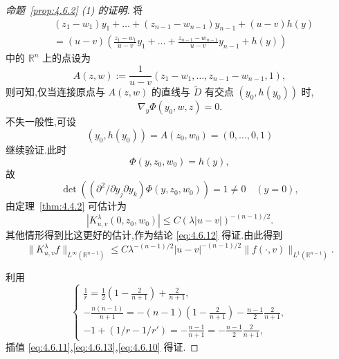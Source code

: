 \begin{proof}[命题~\ref{prop:4.6.2} (1) 的证明]
将
\begin{equation}
\begin{aligned}
& (z_{1} - w_{1})y_{1} + \ldots + (z_{n-1} - w_{n-1})y_{n-1} + (u - v)h(y) \\
& = (u - v)\left(\frac{z_{1} - w_{1}}{u - v}y_{1} + \ldots + \frac{z_{n-1} - w_{n-1}}{u - v}y_{n-1} + h(y)\right)
\end{aligned}
\end{equation}
中的 $\mathbb{R}^{n}$ 上的点设为
\begin{equation*}
A(z, w) := \frac{1}{u - v}(z_{1} - w_{1}, \ldots, z_{n-1} - w_{n-1}, 1),
\end{equation*}
则可知,仅当连接原点与 $A(z, w)$ 的直线与 $\tilde{D}$ 有交点 $(y_{0}, h(y_{0}))$ 时,
\begin{equation*}
\nabla_{y}\Phi(y_{0}, w, z) = 0.
\end{equation*}
不失一般性,可设
\begin{equation*}
(y_{0}, h(y_{0})) = A(z_{0}, w_{0}) = (0, \ldots, 0, 1)
\end{equation*}
继续验证.此时
\begin{equation*}
\Phi(y, z_{0}, w_{0}) = h(y),
\end{equation*}
故
\begin{equation*}
\det\left(\left(\partial^{2}/\partial y_{j}\partial y_{k}\right)\Phi(y, z_{0}, w_{0})\right) = 1 \neq 0 \quad (y = 0),
\end{equation*}
由定理~\ref{thm:4.4.2} 可估计为
\begin{equation*}
\left|K_{u,v}^{\lambda}(0, z_{0}, w_{0})\right| \leq C(\lambda|u - v|)^{-(n-1)/2}.
\end{equation*}
其他情形得到比这更好的估计,作为结论 \eqref{eq:4.6.12} 得证.由此得到
\begin{equation}
\|K_{u,v}^{\lambda}f\|_{L^{\infty}(\mathbb{R}^{n-1})} \leq C\lambda^{-(n-1)/2}|u - v|^{-(n-1)/2}\|f(\cdot, v)\|_{L^{1}(\mathbb{R}^{n-1})}.\tag{4.6.13}
\label{eq:4.6.13}\end{equation}

利用
\begin{equation*}
\begin{cases}
\frac{1}{r} = \frac{1}{2}\left(1 - \frac{2}{n+1}\right) + \frac{2}{n+1}, \\
-\frac{n(n-1)}{n+1} = -(n-1)\left(1 - \frac{2}{n+1}\right) - \frac{n-1}{2}\frac{2}{n+1}, \\
-1 + \left(1/r - 1/r'\right) = -\frac{n-1}{n+1} = -\frac{n-1}{2}\frac{2}{n+1},
\end{cases}
\end{equation*}
插值 \eqref{eq:4.6.11},\eqref{eq:4.6.13},\eqref{eq:4.6.10} 得证.
\end{proof}

